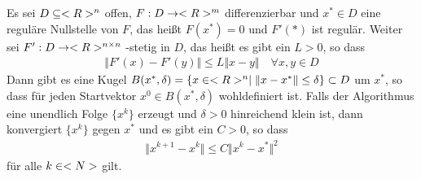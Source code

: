 \begin{proposition}
	Es sei $D\subseteq<R>^n$ offen, $F:D\to<R>^m$ differenzierbar und $x^\ast\in D$ eine reguläre Nullstelle von $F$, das heißt $F(x ^\ast)=0$ und $F'(\ast)$ ist regulär. Weiter sei $F':D\to<R>^{n\times n}$ -stetig in $D$, das heißt es gibt ein $L>0$, so dass
	\begin{align}
		\label{5.2}
		\Vert F'(x) - F'(y)\Vert \le L\Vert x-y\Vert\quad\forall x,y\in D 
	\end{align} 
	Dann gibt es eine Kugel $B(x^\ast,\delta)=\{x\in<R>^n\mid \Vert x-x^\ast\Vert\le\delta\}\subset D$ um $x^\ast$, so dass  für jeden Startvektor $x^0\in B(x^\ast,\delta)$ wohldefiniert ist. Falls der Algorithmus eine unendlich Folge $\{x ^k\}$ erzeugt und $\delta>0$ hinreichend klein ist, dann konvergiert $\{x^k\}$ gegen $x^\ast$ und es gibt ein $C>0$, so dass
	\begin{align}
		\label{5.3}
		\Vert x^{k+1} - x^k\Vert \le C\Vert x^k-x^\ast\Vert^2
	\end{align}
	für alle $k\in<N>$ gilt.
\end{proposition}
